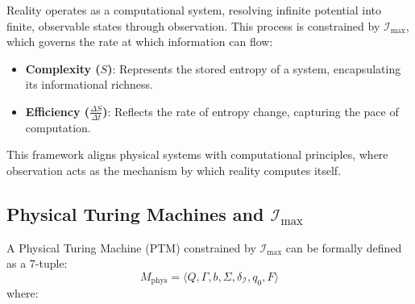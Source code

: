 \documentclass[12pt]{article}
\begin{document}
Reality operates as a computational system, resolving infinite potential into finite, observable states through observation. This process is constrained by \(\mathcal{I}_{\text{max}}\), which governs the rate at which information can flow:
\begin{itemize}
    \item \textbf{Complexity (\(S\))}: Represents the stored entropy of a system, encapsulating its informational richness.
    \item \textbf{Efficiency (\(\frac{\Delta S}{\Delta t}\))}: Reflects the rate of entropy change, capturing the pace of computation.
\end{itemize}

This framework aligns physical systems with computational principles, where observation acts as the mechanism by which reality computes itself.


\subsection{Physical Turing Machines and \(\mathcal{I}_{\text{max}}\)}

A Physical Turing Machine (PTM) constrained by \(\mathcal{I}_{\text{max}}\) can be formally defined as a 7-tuple:
\[
M_{\text{phys}} = \langle Q, \Gamma, b, \Sigma, \delta_{\mathcal{I}}, q_0, F \rangle
\]
where:
\end{document}
